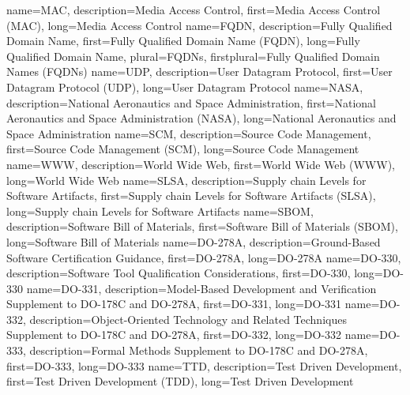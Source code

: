 {%
    name={MAC},
    description={Media Access Control},
    first={Media Access Control (MAC)},
    long={Media Access Control}
}
{%
    name={FQDN},
    description={Fully Qualified Domain Name},
    first={Fully Qualified Domain Name (FQDN)},
    long={Fully Qualified Domain Name},
    plural={FQDNs},
    firstplural={Fully Qualified Domain Names (FQDNs)}
}
{%
    name={UDP},
    description={User Datagram Protocol},
    first={User Datagram Protocol (UDP)},
    long={User Datagram Protocol}
}
{%
    name={NASA},
    description={National Aeronautics and Space Administration},
    first={National Aeronautics and Space Administration (NASA)},
    long={National Aeronautics and Space Administration}
}
{%
    name={SCM},
    description={Source Code Management},
    first={Source Code Management (SCM)},
    long={Source Code Management}
}
{%
    name={WWW},
    description={World Wide Web},
    first={World Wide Web (WWW)},
    long={World Wide Web}
}
{%
    name={SLSA},
    description={Supply chain Levels for Software Artifacts},
    first={Supply chain Levels for Software Artifacts (SLSA)},
    long={Supply chain Levels for Software Artifacts}
}
{%
    name={SBOM},
    description={Software Bill of Materials},
    first={Software Bill of Materials (SBOM)},
    long={Software Bill of Materials}
}
{%
    name={DO-278A},
    description={Ground-Based Software Certification Guidance},
    first={DO-278A},
    long={DO-278A}
}
{%
    name={DO-330},
    description={Software Tool Qualification Considerations},
    first={DO-330},
    long={DO-330}
}
{%
    name={DO-331},
    description={Model-Based Development and Verification Supplement to DO-178C and DO-278A},
    first={DO-331},
    long={DO-331}
}
{%
    name={DO-332},
    description={Object-Oriented Technology and Related Techniques Supplement to DO-178C and DO-278A},
    first={DO-332},
    long={DO-332}
}
{%
    name={DO-333},
    description={Formal Methods Supplement to DO-178C and DO-278A},
    first={DO-333},
    long={DO-333}
}
{%
    name={TTD},
    description={Test Driven Development},
    first={Test Driven Development (TDD)},
    long={Test Driven Development}
}